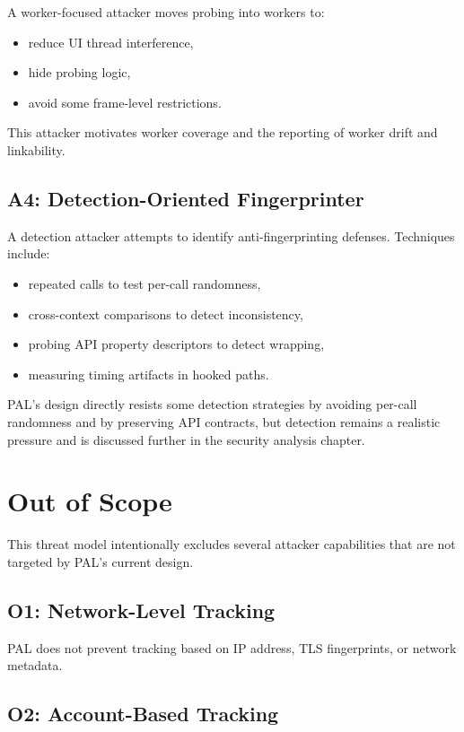 \documentclass[11pt]{report}
\begin{document}
A worker-focused attacker moves probing into workers to:

\begin{itemize}
    \item reduce UI thread interference,
    \item hide probing logic,
    \item avoid some frame-level restrictions.
\end{itemize}

This attacker motivates worker coverage and the reporting of worker drift and linkability.

\subsection{A4: Detection-Oriented Fingerprinter}

A detection attacker attempts to identify anti-fingerprinting defenses. Techniques include:

\begin{itemize}
    \item repeated calls to test per-call randomness,
    \item cross-context comparisons to detect inconsistency,
    \item probing API property descriptors to detect wrapping,
    \item measuring timing artifacts in hooked paths.
\end{itemize}

PAL’s design directly resists some detection strategies by avoiding per-call randomness and by preserving API contracts, but detection remains a realistic pressure and is discussed further in the security analysis chapter.

\section{Out of Scope}

This threat model intentionally excludes several attacker capabilities that are not targeted by PAL’s current design.

\subsection{O1: Network-Level Tracking}

PAL does not prevent tracking based on IP address, TLS fingerprints, or network metadata.

\subsection{O2: Account-Based Tracking}
\end{document}
